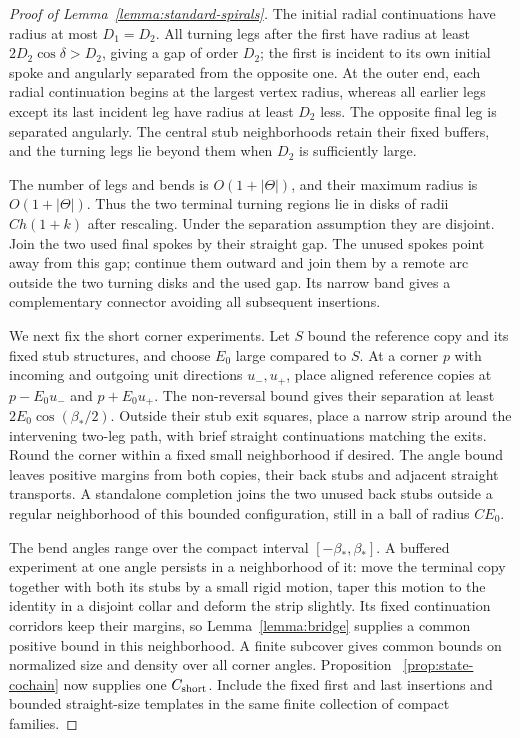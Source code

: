 \begin{proof}[Proof of Lemma~\ref{lemma:standard-spirals}]
The initial radial continuations have radius at most $D_1=D_2$.  All
turning legs after the first have radius at least
$2D_2\cos\delta>D_2$, giving a gap of order $D_2$; the first is incident
to its own initial spoke and angularly separated from the opposite one.
At the outer end, each radial continuation begins at the largest vertex
radius, whereas all earlier legs except its last incident leg have
radius at least $D_2$ less.  The opposite final leg is separated
angularly.  The central stub neighborhoods retain their fixed buffers,
and the turning legs lie beyond them when $D_2$ is sufficiently large.

The number of legs and bends is $O(1+|\Theta|)$, and their maximum radius
is $O(1+|\Theta|)$.  Thus the two terminal turning regions lie in disks
of radii $Ch(1+k)$ after rescaling.  Under the separation assumption
they are disjoint.  Join the two used final spokes by their straight
gap.  The unused spokes point away from this gap; continue them outward
and join them by a remote arc outside the two turning disks and the
used gap.  Its narrow band gives a complementary connector avoiding
all subsequent insertions.

We next fix the short corner experiments.  Let $S$ bound the reference
copy and its fixed stub structures, and choose $E_0$ large compared to
$S$.  At a corner $p$ with incoming and outgoing unit directions
$u_-,u_+$, place aligned reference copies at
$p-E_0u_-$ and $p+E_0u_+$.  The non-reversal bound gives their separation
at least $2E_0\cos(\beta_*/2)$.  Outside their stub exit squares, place
a narrow strip around the intervening two-leg path, with brief straight
continuations matching the exits.  Round the corner within a fixed
small neighborhood if desired.  The angle bound leaves positive margins
from both copies, their back stubs and adjacent straight transports.
A standalone completion joins the two unused back stubs outside a
regular neighborhood of this bounded configuration, still in a ball
of radius $C E_0$.

The bend angles range over the compact interval $[-\beta_*,\beta_*]$.
A buffered experiment at one angle persists in a neighborhood of it:
move the terminal copy together with both its stubs by a small rigid
motion, taper this motion to the identity in a disjoint collar and
deform the strip slightly.  Its fixed continuation corridors keep
their margins, so Lemma~\ref{lemma:bridge} supplies a common positive
bound in this neighborhood.  A finite subcover gives common bounds on
normalized size and density over all corner angles.  Proposition~
\ref{prop:state-cochain} now supplies one $C_{\rm short}$.  Include the
fixed first and last insertions and bounded straight-size templates in
the same finite collection of compact families.


\end{proof}
